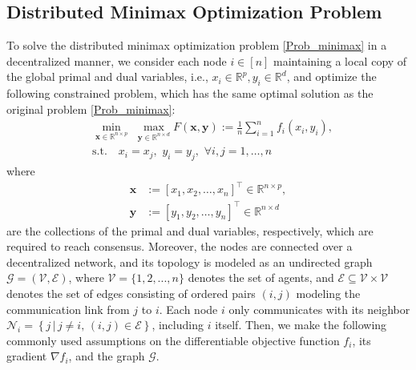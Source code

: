 \documentclass[10pt,a4paper]{amsart}
\begin{document}
\subsection{Distributed Minimax Optimization Problem}
To solve the distributed minimax optimization problem \eqref{Prob_minimax} in a decentralized manner, we consider each node $i\in[n]$ maintaining a local copy of the global primal and dual variables, i.e., $x_i\in \mathbb{R} ^p, y_i\in \mathbb{R} ^d$, and optimize the following constrained problem, which has the same optimal solution as the original problem \eqref{Prob_minimax}: 
\begin{equation}\label{Prob_minimax_constained}
\begin{aligned}
&\underset{\mathbf{x}\in \mathbb{R} ^{n\times p}}{\min}\,\,\underset{\mathbf{y}\in \mathbb{R} ^{n\times d}}{\max}F\left( \mathbf{x},\mathbf{y} \right) :=\frac{1}{n}\sum_{i=1}^n{f_i\left( x_i,y_i \right) ,}
\\
&\text{s.t.} \quad x_i=x_j,\,\, y_i=y_j, \,\, \forall i, j=1,\dots ,n
\end{aligned}
\end{equation}
where 
\begin{equation*}
\begin{aligned}
\mathbf{x}&:=\left[ x_1,x_2,\dots ,x_n \right] ^{\top}\in \mathbb{R} ^{n\times p},
\\
\mathbf{y}&:=\left[ y_1,y_2,\dots ,y_n \right] ^{\top}\in \mathbb{R} ^{n\times d}
\end{aligned}
\end{equation*}
are the collections of the primal and dual variables, respectively, which are required to reach consensus.
Moreover, the nodes are connected over a decentralized network, and its topology is modeled as an undirected graph $\mathcal{G}=(\mathcal{V},\mathcal{E})$, where $\mathcal{V}=\{1,2,...,n\}$ denotes the set of agents, and $\mathcal{E}\subseteq\mathcal{V}\times \mathcal{V}$ denotes the set of edges consisting of ordered pairs $(i,j)$ modeling the communication link from $j$ to $i$. Each node $i$ only communicates with its neighbor $\mathcal{N}_i=\left\{ j\,|\,j\ne i,\, \left( i, j \right) \in \mathcal{E} \right\} $, including $i$ itself.
Then, we make the following commonly used assumptions on the differentiable objective function $f_i$, its gradient $\nabla f_i$, and the graph $\mathcal{G}$.
\end{document}
